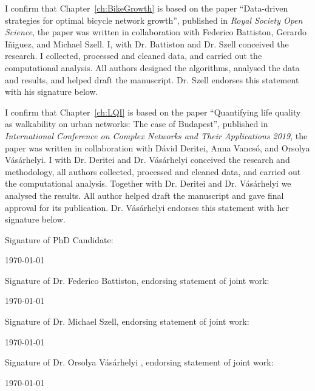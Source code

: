 \documentclass[a4paper,twoside,12pt]{book}
\begin{document}
I confirm that Chapter~\ref{ch:BikeGrowth} is based on the paper ``Data-driven strategies for optimal bicycle network growth'', published in \textit{Royal Society Open Science}, the paper was written in collaboration with Federico Battiston, Gerardo I\~niguez, and Michael Szell. I, with Dr. Battiston and Dr. Szell conceived the research. I collected, processed and cleaned data, and carried out the computational analysis. All authors designed the algorithms, analysed the data and results, and helped draft the manuscript. Dr. Szell endorses this statement with his signature below.

\vspace{.2cm}

\noindent
I confirm that Chapter~\ref{ch:LQI} is based on the paper ``Quantifying life quality as walkability on urban networks: The case of Budapest'', published in \textit{International Conference on Complex Networks and Their Applications 2019}, the paper was written in collaboration with D\'avid Deritei, Anna Vancs\'o, and Orsolya V\'as\'arhelyi. I with Dr. Deritei and Dr. V\'as\'arhelyi conceived the research and methodology, all authors collected, processed and cleaned data, and carried out the computational analysis. Together with Dr. Deritei and Dr. V\'as\'arhelyi we analysed the results. All author helped draft the manuscript and gave final approval for its publication. Dr. V\'as\'arhelyi endorses this statement with her signature below.

\vspace{1.5cm}
\noindent
Signature of PhD Candidate:

\vspace{2cm}
\noindent
\monthyeardate\today


\vspace{3.5cm}
\noindent
Signature of Dr. Federico Battiston, endorsing statement of joint work:

\vspace{2cm}
\noindent
\monthyeardate\today


\vspace{3.5cm}
\noindent
Signature of Dr. Michael Szell, endorsing statement of joint work:

\vspace{2cm}
\noindent
\monthyeardate\today

\vspace{3.5cm}
\noindent
Signature of Dr. Orsolya V\'as\'arhelyi , endorsing statement of joint work:

\vspace{2cm}
\noindent
\monthyeardate\today
\end{document}
